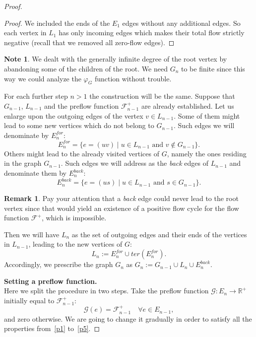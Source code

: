 \documentclass[12pt]{article}
\renewcommand{\cal}[1]{\mathcal{#1}}
\newcommand{\gfi}{\varphi_{G}}
\theoremstyle{definition}
\newtheorem{remark}{Remark}
\newtheorem*{note}{Note}
\newcommand{\flowpos}{\mathcal{F}^{+}}
\newcommand{\flowposn}[1]{\mathcal{F}_{#1}^{+}}
\newcommand{\ter}{ter}
\newcommand{\eback}{E^{back}}
\newcommand{\efor}{E^{for}}
\numberwithin{remark}{section}
\numberwithin{theorem}{section}
\numberwithin{prop}{section}
\numberwithin{equation}{section}
\numberwithin{lemma}{section}
\numberwithin{prop_under_lemma}{lemma}
\begin{document}
\begin{proof}
\begin{proof}
        We included the ends of the $E_1$ edges without any additional edges.
        So each vertex in $L_1$ has only incoming edges which makes their total flow strictly negative (recall that we removed all zero-flow edges).
      \end{proof}
      \begin{note}
        We dealt with the generally infinite degree of the root vertex by abandoning some of the children of the root.
        We need $G_n$ to be finite since this way we could analyze the $\gfi$ function without trouble.
      \end{note}
      For each further step $n > 1$ the construction will be the same.
      Suppose that $G_{n-1}$, $L_{n-1}$ and the preflow function $\flowposn{n-1}$ are already established.
      Let us enlarge upon the outgoing edges of the vertex $v \in L_{n-1}$.
      Some of them might lead to some new vertices which do not belong to $G_{n-1}$.
      Such edges we will denominate by $\efor_n$:
      \[
        \efor_n = \Big\{ e = (uv) \mid u \in L_{n-1} \text{ and } v \notin G_{n-1}\Big\}.
      \]
      Others might lead to the already visited vertices of $G$, namely the ones residing in the graph $G_{n-1}$.
      Such edges we will address as the \emph{back} edges of $L_{n-1}$ and denominate them by $\eback_n$:
      \[
        \eback_n = \Big\{e = (us) \mid u \in L_{n-1} \text{ and } s \in G_{n-1}\Big\}.
      \]
      \begin{remark}
        Pay your attention that a \emph{back} edge could never lead to the root vertex since that
          would yield an existence of a positive flow cycle for the flow function $\flowpos$,
          which is impossible.
      \end{remark}
      Then we will have $L_n$ as the set of outgoing edges and their ends of the vertices in $L_{n-1}$, leading to the new vertices of $G$:
      \[
        L_n := \efor_n \cup \ter(\efor_n).
      \]
      Accordingly, we prescribe the graph $G_n$ as $G_n := G_{n-1} \cup L_n \cup \eback_n$.

      \noindent\textbf{Setting a preflow function.}\\
      \noindent Here we split the procedure in two steps.
      Take the preflow function $\cal{G}: E_n \to \mathbb{R}^{+}$ initially equal to $\flowposn{n-1}$:
      \[
        \cal{G}(e) = \flowposn{n-1} \quad \forall e \in E_{n-1},
      \]
      and zero otherwise.
      We are going to change it gradually in order to satisfy all the properties from~\ref{p1} to~\ref{p5}.
      

\end{proof}
\end{document}
